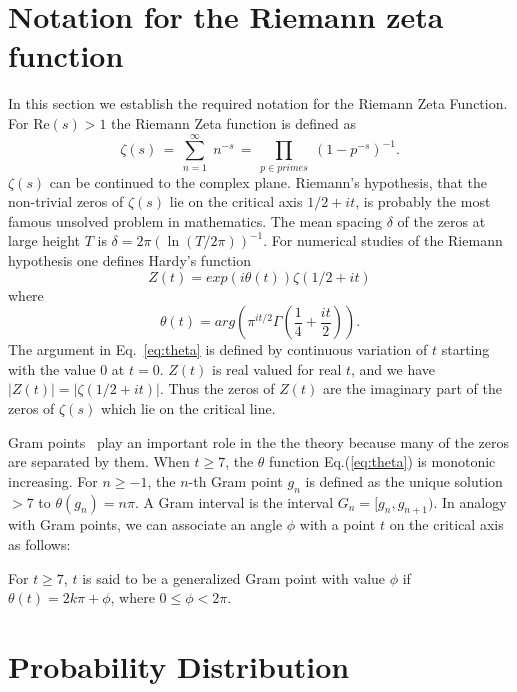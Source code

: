 \documentclass[twoside]{article}
\begin{document}
\section{\label{sec2}Notation for the Riemann zeta function}

In this section we  establish the required notation for the 
Riemann Zeta Function. 
For $\mathrm{Re} (s) > 1$ the Riemann Zeta function is defined as
\begin{equation}
\zeta ( s ) \, = \, \sum^{\infty}_{n = 1} \; n^{-s} \, = \, \prod_{p \in primes} \;
\left( 1 - p^{-s} \right)^{-1}.
\label{eqRie}
\end{equation}
 $\zeta ( s )$ can be continued to
the complex plane. Riemann's hypothesis, that the non-trivial zeros of $\zeta ( s )$ lie on the 
critical axis $1/2+it$, is probably the most famous unsolved problem in mathematics.
The mean spacing $\delta$ of the zeros  at large height $T$ is $\delta = 2\pi(\ln (T/2\pi))^{-1}$. 
For numerical studies of the Riemann hypothesis one defines Hardy's function
\begin{equation}
Z(t)=exp(i\theta(t))\zeta(1/2 +it) 
\label{eq:hardy}
\end{equation}
where 
\begin{equation}
\theta(t) = arg (\pi^{it/2} \Gamma(\frac{1}{4} + \frac{it}{2})). 
\label{eq:theta}
\end{equation}
The argument in Eq.~\ref{eq:theta} is defined by continuous variation of $t$ starting with the value $0$ at $t = 0$.
$Z(t)$ is real valued for real $t$,
and we have $|Z(t)| = |\zeta(1/2+it)|$. Thus the zeros of $Z(t)$ are the imaginary part of the zeros 
of $\zeta(s)$ which lie on the critical line.  

Gram points~\cite{Gram 1903} play an important role in the the theory because many of the zeros are separated by them.  When $t \ge 7$, the $\theta$ function Eq.(\ref{eq:theta}) is monotonic increasing. 
For $n \ge -1$, the $n$-th Gram point $g_n$ is defined as the unique solution $> 7$ to
$\theta (g_n) = n\pi$. A Gram interval is the interval $G_n = [g_n,g_{n+1})$.
 In analogy with Gram points, we can associate an angle $\phi$ with a point $t$ on the critical axis as follows:
\begin{definition}\label{phi}
For $t \ge 7$, $t$ is said to be a generalized Gram point with value $\phi$  if
$\theta (t) = 2k\pi + \phi$, where $0 \le \phi < 2\pi$.
\end{definition}



\section{\label{sec3}Probability Distribution}
\end{document}
